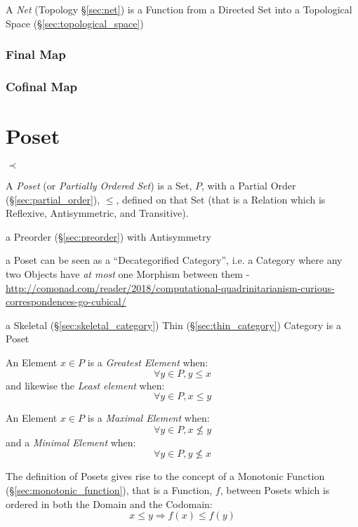 \fist A \emph{Net} (Topology \S\ref{sec:net}) is a Function from a Directed Set
into a Topological Space (\S\ref{sec:topological_space})



\subsubsection{Final Map}\label{sec:final_map}

\subsubsection{Cofinal Map}\label{sec:cofinal_map}



\section{Poset}\label{sec:poset}

$\prec$

A \emph{Poset} (or \emph{Partially Ordered Set}) is a Set, $P$, with a
Partial Order (\S\ref{sec:partial_order}), $\leq$, defined on that
Set (that is a Relation which is Reflexive, Antisymmetric, and
Transitive).

a Preorder (\S\ref{sec:preorder}) with Antisymmetry

a Poset can be seen as a ``Decategorified Category'', i.e. a Category where any
two Objects have \emph{at most} one Morphism between them -
\url{http://comonad.com/reader/2018/computational-quadrinitarianism-curious-correspondences-go-cubical/}

a Skeletal (\S\ref{sec:skeletal_category}) Thin
(\S\ref{sec:thin_category}) Category is a Poset

An Element $x \in P$ is a \emph{Greatest Element} when:
\[
  \forall y \in P, y \leq x
\]
and likewise the \emph{Least element} when:
\[
  \forall y \in P, x \leq y
\]

An Element $x \in P$ is a \emph{Maximal Element} when:
\[
  \forall y \in P, x \nleq y
\]
and a \emph{Minimal Element} when:
\[
  \forall y \in P, y \nleq x
\]

The definition of Posets gives rise to the concept of a Monotonic
Function (\S\ref{sec:monotonic_function}), that is a Function, $f$,
between Posets which is ordered in both the Domain and the Codomain:
\[
  x \leq y \Rightarrow f(x) \leq f(y)
\]

